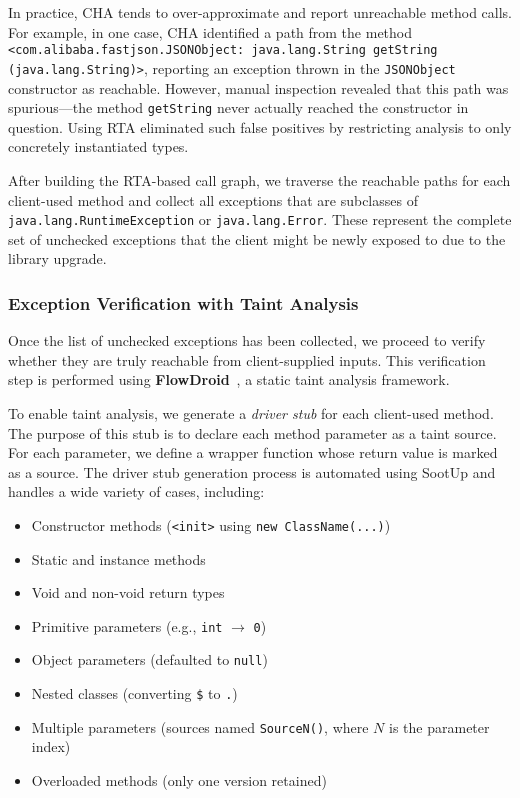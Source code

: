 In practice, CHA tends to over-approximate and report unreachable method calls. For example, in one case, CHA identified a path from the method \texttt{<com.alibaba.fastjson.JSONObject: java.lang.String getString (java.lang.String)>}, reporting an exception thrown in the \texttt{JSONObject} constructor as reachable. However, manual inspection revealed that this path was spurious—the method \texttt{getString} never actually reached the constructor in question. Using RTA eliminated such false positives by restricting analysis to only concretely instantiated types.

After building the RTA-based call graph, we traverse the reachable paths for each client-used method and collect all exceptions that are subclasses of \texttt{java.lang.RuntimeException} or \texttt{java.lang.Error}. These represent the complete set of unchecked exceptions that the client might be newly exposed to due to the library upgrade.

\subsubsection{Exception Verification with Taint Analysis}

Once the list of unchecked exceptions has been collected, we proceed to verify whether they are truly reachable from client-supplied inputs. This verification step is performed using \textbf{FlowDroid}~\cite{Arzt14:_flowdroid}, a static taint analysis framework. 

To enable taint analysis, we generate a \textit{driver stub} for each client-used method. The purpose of this stub is to declare each method parameter as a taint source. For each parameter, we define a wrapper function whose return value is marked as a source. The driver stub generation process is automated using SootUp and handles a wide variety of cases, including:
\begin{itemize}
  \item Constructor methods (\texttt{<init>} using \texttt{new ClassName(...)})
  \item Static and instance methods
  \item Void and non-void return types
  \item Primitive parameters (e.g., \texttt{int} $\rightarrow$ \texttt{0})
  \item Object parameters (defaulted to \texttt{null})
  \item Nested classes (converting \texttt{\$} to \texttt{.})
  \item Multiple parameters (sources named \texttt{SourceN()}, where $N$ is the parameter index)
  \item Overloaded methods (only one version retained)
\end{itemize}

